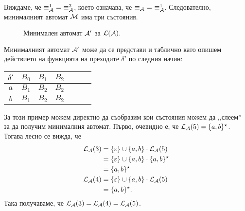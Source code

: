 \begin{extra2}
\begin{solution}
\begin{itemize}
    
    Виждаме, че $\equiv^1_\A\ =\ \equiv^2_\A$,
    което означава, че $\equiv_{\mathcal{A}}\ =\ \equiv^1_{\mathcal{A}}$.
    Следователно, минималният автомат $\mathcal{M}$ има три състояния.

  \begin{figure}[H]
    \centering
  \caption{Минимален автомат $\mathcal{A}'$ за $\mathcal{L}(\mathcal{A})$.}
  \label{fig:min1}
\end{figure}
    
    Минималният автомат $\mathcal{A}'$ може да се представи и таблично като опишем действието на функцията на преходите $\delta'$ по следния начин:

    \begin{tabular}{|c|c|c|c|c|c|c|}
      \hline
      $\delta'$ & $B_0$ & $B_1$ & $B_2$ \\
      \hline
      $a$ & $B_1$ & $B_2$ & $B_2$ \\
      \hline
      $b$ & $B_1$ & $B_2$ & $B_2$ \\
      \hline
    \end{tabular}
  \end{itemize}
  

\end{solution}

\begin{remark}
  За този пример можем директно да съобразим кои състояния можем да ,,слеем'' за да получим минималния автомат.
  Първо, очевидно е, че $\mathcal{L}_{\mathcal{A}}(5) = \{a,b\}^\star$.
  Тогава лесно се вижда, че
  \begin{align*}
    \mathcal{L}_{\mathcal{A}}(3) & = \{\varepsilon\} \cup \{a,b\}\cdot\mathcal{L}_{\mathcal{A}}(5)\\
             & = \{\varepsilon\} \cup \{a,b\}\cdot\{a,b\}^\star\\
             & = \{a,b\}^\star\\
    \mathcal{L}_{\mathcal{A}}(4) & = \{\varepsilon\} \cup \{a,b\}\cdot\mathcal{L}_{\mathcal{A}}(5)\\
             & = \{a,b\}^\star.
  \end{align*}
  Така получаваме, че $\mathcal{L}_{\mathcal{A}}(3) = \mathcal{L}_{\mathcal{A}}(4) = \mathcal{L}_{\mathcal{A}}(5)$.
  

\end{remark}
\end{extra2}
